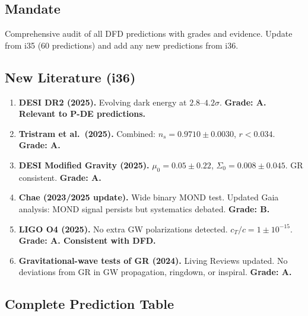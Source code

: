 \documentclass[11pt,a4paper]{article}
\begin{document}
\subsection{Mandate}

Comprehensive audit of all DFD predictions with grades and evidence. Update from i35 (60 predictions) and add any new predictions from i36.

\subsection{New Literature (i36)}

\begin{enumerate}
\item \textbf{DESI DR2 (2025).} Evolving dark energy at $2.8$--$4.2\sigma$. \textbf{Grade: A. Relevant to P-DE predictions.}

\item \textbf{Tristram et al.\ (2025).} Combined: $n_s = 0.9710 \pm 0.0030$, $r < 0.034$. \textbf{Grade: A.}

\item \textbf{DESI Modified Gravity (2025).} $\mu_0 = 0.05 \pm 0.22$, $\Sigma_0 = 0.008 \pm 0.045$. GR consistent. \textbf{Grade: A.}

\item \textbf{Chae (2023/2025 update).} Wide binary MOND test. Updated Gaia analysis: MOND signal persists but systematics debated. \textbf{Grade: B.}

\item \textbf{LIGO O4 (2025).} No extra GW polarizations detected. $c_T/c = 1 \pm 10^{-15}$. \textbf{Grade: A. Consistent with DFD.}

\item \textbf{Gravitational-wave tests of GR (2024).} Living Reviews updated. No deviations from GR in GW propagation, ringdown, or inspiral. \textbf{Grade: A.}
\end{enumerate}

\subsection{Complete Prediction Table}
\end{document}
